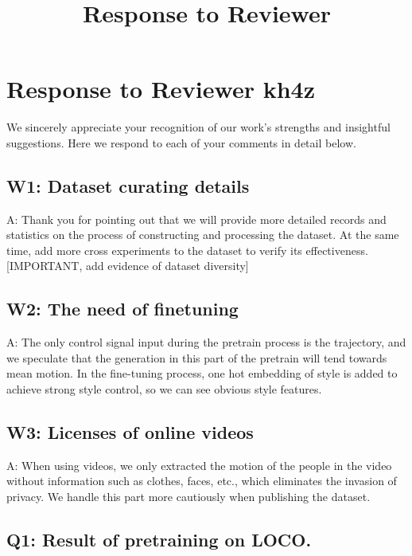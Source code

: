 \documentclass{article}
\title{Response to Reviewer}
\begin{document}
\maketitle

\section{Response to Reviewer kh4z}\label{response-to-reviewer-kh4z}

We sincerely appreciate your recognition of our work's strengths and insightful suggestions. Here we respond to each of your comments in detail below.

\subsection{W1: Dataset curating details}\label{w1-dataset-curating-details}

A: Thank you for pointing out that we will provide more detailed records and statistics on the process of constructing and processing the dataset. At the same time, add more cross experiments to the dataset to verify its effectiveness. {[}IMPORTANT, add evidence of dataset diversity{]}

\subsection{W2: The need of finetuning}\label{w2-the-need-of-finetuning}

A: The only control signal input during the pretrain process is the trajectory, and we speculate that the generation in this part of the pretrain will tend towards mean motion. In the fine-tuning process, one hot embedding of style is added to achieve strong style control, so we can see obvious style features.

\subsection{W3: Licenses of online videos}\label{w3-licenses-of-online-videos}

A: When using videos, we only extracted the motion of the people in the video without information such as clothes, faces, etc., which eliminates the invasion of privacy. We handle this part more cautiously when publishing the dataset.

\subsection{Q1: Result of pretraining on LOCO.}\label{q1-result-of-pretraining-on-loco.}
\end{document}
